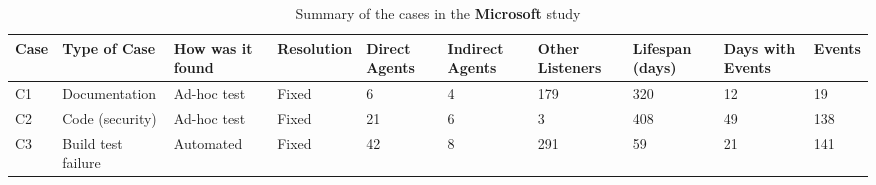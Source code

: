 \begin{landscape}
\begin{table}[tbp]
\caption{\label{tab:MicrosoftCases} Summary of the cases in the \textbf{Microsoft} study}
\centering
\footnotesize{\begin{tabular}{p{1.6cm}p{2.6cm}p{2.2cm}p{2.2cm}p{1.6cm}p{1.6cm}p{1.6cm}p{1.6cm}p{1.6cm}p{1.6cm}}
\hline \hline
\vspace{0.5pt} \bfseries Case & \vspace{0.5pt} \bfseries Type of Case & \vspace{0.5pt} \bfseries How was it found & \vspace{0.5pt} \bfseries Resolution & \vspace{0.5pt} \bfseries Direct Agents & \vspace{0.5pt} \bfseries Indirect Agents & \vspace{0.5pt} \bfseries Other Listeners & \vspace{0.5pt} \bfseries Lifespan (days) & \vspace{0.5pt} \bfseries Days with Events & \vspace{0.5pt} \bfseries Events \\
\hline
\vspace{0.5pt} C1 & \vspace{0.5pt} Documentation & \vspace{0.5pt} Ad-hoc test & \vspace{0.5pt} Fixed & \vspace{0.5pt} 6 & \vspace{0.5pt} 4 & \vspace{0.5pt} 179 & \vspace{0.5pt} 320 & \vspace{0.5pt} 12 & \vspace{0.5pt} 19 \\
\hline
\vspace{0.5pt} C2 & \vspace{0.5pt} Code (security) & \vspace{0.5pt} Ad-hoc test & \vspace{0.5pt} Fixed & \vspace{0.5pt} 21 & \vspace{0.5pt} 6 & \vspace{0.5pt} 3 & \vspace{0.5pt} 408 & \vspace{0.5pt} 49 & \vspace{0.5pt} 138 \\
\hline
\vspace{0.5pt} C3 & \vspace{0.5pt} Build test failure & \vspace{0.5pt} Automated & \vspace{0.5pt} Fixed & \vspace{0.5pt} 42 & \vspace{0.5pt} 8 & \vspace{0.5pt} 291 & \vspace{0.5pt} 59 & \vspace{0.5pt} 21 & \vspace{0.5pt} 141 \\

\end{tabular}}
\end{table}
\end{landscape}
